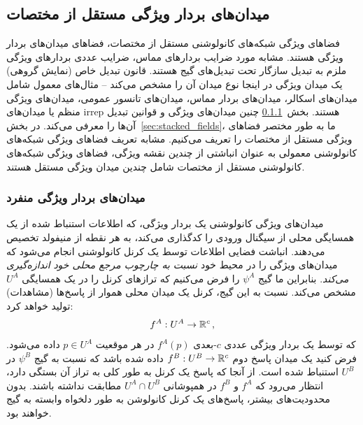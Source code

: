 

\subsection{میدان‌های بردار ویژگی مستقل از مختصات}
\label{sec:feature_fields}

فضاهای ویژگی شبکه‌های کانولوشنی مستقل از مختصات، فضاهای میدان‌های بردار ویژگی هستند.
مشابه مورد ضرایب بردارهای مماس، ضرایب عددی بردارهای ویژگی ملزم به تبدیل سازگار تحت تبدیل‌های گیج هستند.
قانون تبدیل خاص (نمایش گروهی) یک میدان ویژگی در اینجا نوع میدان آن را مشخص می‌کند -- مثال‌های معمول شامل میدان‌های اسکالر، میدان‌های بردار مماس، میدان‌های تانسور عمومی، میدان‌های ویژگی منظم یا میدان‌های irrep هستند.
بخش~\ref{sec:individual_fields} چنین میدان‌های ویژگی و قوانین تبدیل آن‌ها را معرفی می‌کند.
در بخش~\ref{sec:stacked_fields}، ما به طور مختصر فضاهای ویژگی مستقل از مختصات را تعریف می‌کنیم.
مشابه تعریف فضاهای ویژگی شبکه‌های کانولوشنی معمولی به عنوان انباشتی از چندین نقشه ویژگی، فضاهای ویژگی شبکه‌های کانولوشنی مستقل از مختصات شامل چندین میدان ویژگی مستقل هستند.




\subsubsection{میدان‌های بردار ویژگی منفرد}
\label{sec:individual_fields}
میدان‌های ویژگی کانولوشنی یک بردار ویژگی، که اطلاعات استنباط شده از یک همسایگی محلی از سیگنال ورودی را کدگذاری می‌کند، به هر نقطه از منیفولد تخصیص می‌دهند.
انباشت فضایی اطلاعات توسط یک کرنل کانولوشنی انجام می‌شود که میدان‌های ویژگی را در محیط خود \emph{نسبت به چارچوب مرجع محلی خود} \emph{اندازه‌گیری می‌کند}.
بنابراین ما گیج $\psi^A$ را فرض می‌کنیم که ترازهای کرنل را در یک همسایگی $U^A$ مشخص می‌کند.
نسبت به این گیج، کرنل یک میدان محلی هموار از پاسخ‌ها (مشاهدات) تولید خواهد کرد:
\begin{align}
	f^A:U^A\to\mathbb{R}^c \,,
\end{align}
که توسط یک بردار ویژگی عددی $c$-بعدی $f^A(p)$ در هر موقعیت $p\in U^A$ داده می‌شود.
فرض کنید یک میدان پاسخ دوم $f^B:U^B\to\mathbb{R}^c$ داده شده باشد که نسبت به گیج $\psi^B$ در $U^B$ استنباط شده است.
از آنجا که پاسخ یک کرنل به طور کلی به تراز آن بستگی دارد، انتظار می‌رود که $f^A$ و $f^B$ در همپوشانی $U^A\cap U^B$ مطابقت نداشته باشند.
بدون محدودیت‌های بیشتر، پاسخ‌های یک کرنل کانولوشن به طور دلخواه وابسته به گیج خواهند بود.

